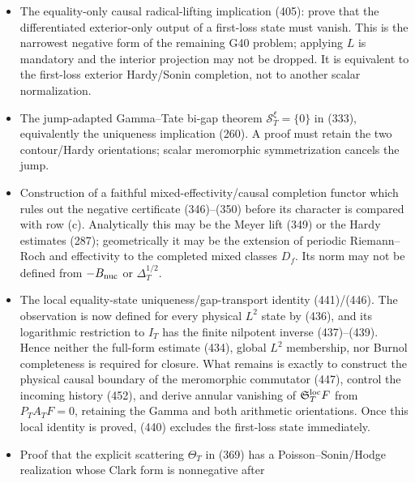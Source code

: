 \documentclass[11pt]{article}
\begin{document}
\begin{itemize}
      the target \(P_-\mathcal E_TF\) has fixed positive distance from the
      physical range, so finite right inverses cannot converge to it.
      The meromorphic co-Poisson functional equation does not control the
      incoming history (452), and reciprocal-gap completeness does not
      supply the missing product rule.
\item The equality-only causal radical-lifting implication (405): prove that
      the differentiated exterior-only output of a first-loss state must
      vanish.  This is the narrowest negative form of the remaining G40
      problem; applying $L$ is mandatory and the interior projection may not
      be dropped.  It is equivalent to the first-loss exterior Hardy/Sonin
      completion, not to another scalar normalization.
\item The jump-adapted Gamma--Tate bi-gap theorem
      $\mathscr S_T^\xi=\{0\}$ in (333), equivalently the uniqueness
      implication (260).  A proof must retain the two contour/Hardy
      orientations; scalar meromorphic symmetrization cancels the jump.
\item Construction of a faithful mixed-effectivity/causal completion
      functor which rules out the negative certificate (346)--(350) before
      its character is compared with row (c).  Analytically this may be the
      Meyer lift (349) or the Hardy estimates (287); geometrically it may be
      the extension of periodic Riemann--Roch and effectivity to the completed
      mixed classes $D_f$.  Its norm may not be defined from
      $-B_{\rm nuc}$ or $\Delta_T^{1/2}$.
\item The local equality-state uniqueness/gap-transport identity
      (441)/(446).  The
      observation is now defined for every physical $L^2$ state by (436), and
      its logarithmic restriction to $I_T$ has the finite nilpotent inverse
      (437)--(439).  Hence neither the full-form estimate (434), global
      $L^2$ membership, nor Burnol completeness is required for closure.
      What remains is exactly to construct the physical causal boundary of
      the meromorphic commutator (447), control the incoming history (452),
      and derive annular vanishing of
      $\mathfrak S_T^{\rm loc}F$ from $P_TA_TF=0$, retaining the Gamma and
      both arithmetic orientations.  Once this local identity is proved,
      (440) excludes the first-loss state immediately.
\item Proof that the explicit scattering $\Theta_T$ in (369) has a
      Poisson--Sonin/Hodge realization whose Clark form is nonnegative after

\end{itemize}
\end{document}
